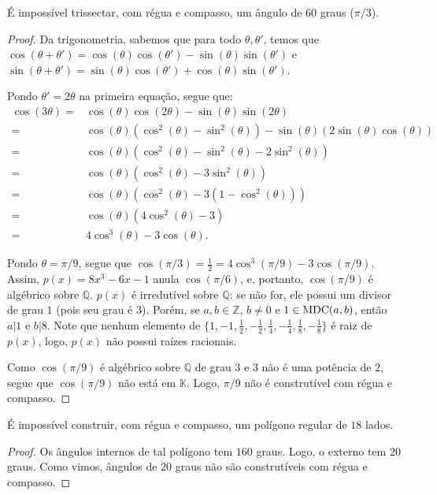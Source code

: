 \begin{prop}
    É impossível trissectar, com régua e compasso, um ângulo de $60$ graus ($\pi/3$).
\end{prop}
\begin{proof}
    Da trigonometria, sabemos que para todo $\theta, \theta'$, temos que $\cos(\theta+\theta')=\cos(\theta)\cos(\theta')-\sin(\theta)\sin(\theta')$ e $\sin(\theta+\theta')=\sin(\theta)\cos(\theta')+\cos(\theta)\sin(\theta')$.

    Pondo $\theta'=2\theta$ na primeira equação, segue que:
    \begin{align*}
        \cos(3\theta)=&\cos(\theta)\cos(2\theta)-\sin(\theta)\sin(2\theta) \\
        =&\cos(\theta)(\cos^2(\theta)-\sin^2(\theta))-\sin(\theta)(2\sin(\theta)\cos(\theta)) \\
        =&\cos(\theta)(\cos^2(\theta)-\sin^2(\theta)-2\sin^2(\theta)) \\
        =&\cos(\theta)(\cos^2(\theta)-3\sin^2(\theta)) \\
        =&\cos(\theta)(\cos^2(\theta)-3(1-\cos^2(\theta))) \\
        =&\cos(\theta)(4\cos^2(\theta)-3) \\
        =&4\cos^3(\theta)-3\cos(\theta).
    \end{align*}    

    Pondo $\theta=\pi/9$, segue que $\cos(\pi/3)=\frac{1}{2}=4\cos^3(\pi/9)-3\cos(\pi/9)$. Assim, $p(x)=8x^3-6x-1$ anula $\cos(\pi/6)$, e, portanto, $\cos(\pi/9)$ é algébrico sobre $\mathbb Q$.
    $p(x)$ é irredutível sobre $\mathbb Q$: se não for, ele possui um divisor de grau $1$ (pois seu grau é $3$). Porém, se $a, b \in \mathbb Z$, $b\neq 0$ e $1\in \operatorname{MDC}(a, b)$, então $a|1$ e $b|8$. Note que nenhum elemento de $\{1, -1, \frac{1}{2}, -\frac{1}{2}, \frac{1}{4}, -\frac{1}{4}, \frac{1}{8}, -\frac{1}{8}\}$ é raiz de $p(x)$, logo, $p(x)$ não possui raízes racionais.

    Como $\cos(\pi/9)$ é algébrico sobre $\mathbb Q$ de grau $3$ e $3$ não é uma potência de $2$, segue que $\cos(\pi/9)$ não está em $\mathbb K$. Logo, $\pi/9$ não é construtível com régua e compasso.
\end{proof}
\begin{prop}
    É impossível construir, com régua e compasso, um polígono regular de $18$ lados.
\end{prop}
\begin{proof}
    Os ângulos internos de tal polígono tem $160$ graus. Logo, o externo tem $20$ graus. Como vimos, ângulos de $20$ graus não são construtíveis com régua e compasso.
\end{proof}

